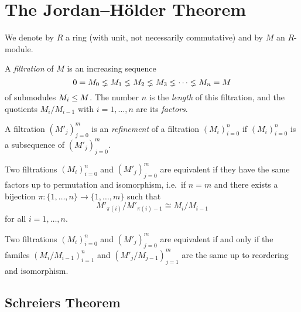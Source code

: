 \section{The Jordan--Hölder Theorem}
\label{appendix: jordan hoelder}


\begin{conventions}
  We denote by $R$ a ring (with unit, not necessarily commutative) and by $M$ an $R$-module.
\end{conventions}


\begin{definition}
  \label{definition: filtration}
  A \emph{filtration} of $M$ is an increasing sequence
  \[
                0
    =           M_0
    \lneq M_1
    \lneq M_2
    \lneq M_3
    \lneq \dotsb
    \lneq M_n
    =           M
  \]
  of submodules $M_i \leq M$.
  The number $n$ is the \emph{length} of this filtration, and the quotients $M_i/M_{i-1}$ with $i = 1, \dotsc, n$ are its \emph{factors}.
\end{definition}


\begin{definition}
  A filtration $(M'_j)_{j=0}^m$ is an \emph{refinement} of a filtration $(M_i)_{i=0}^n$ if $(M_i)_{i=0}^n$ is a subsequence of $(M'_j)_{j=0}^m$.
\end{definition}


\begin{definition}
  Two filtrations $(M_i)_{i=0}^n$ and $(M'_j)_{j=0}^m$ are equivalent if they have the same factors up to permutation and isomorphism, i.e.\ if $n = m$ and there exists a bijection $\pi \colon \{1, \dotsc, n\} \to \{1, \dotsc, m\}$ such that
  \[
          M'_{\pi(i)} / M'_{\pi(i)-1}
    \cong M_i / M_{i-1}
  \]
  for all $i = 1, \dotsc, n$.
\end{definition}


\begin{remark}
  Two filtrations $(M_i)_{i=0}^n$ and $(M'_j)_{j=0}^m$ are equivalent if and only if the familes $(M_i/M_{i-1})_{i=1}^n$ and $(M'_j/M_{j-1})_{j=1}^m$ are the same up to reordering and isomorphism.
\end{remark}







\subsection{Schreiers Theorem}


